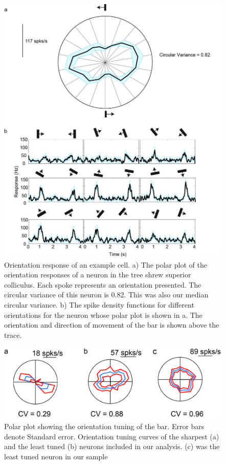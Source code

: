 	\begin{figure}
		
		\includegraphics[width=\linewidth]{superiorcolliculus/SCOriResp.jpg}
		\caption{Orientation response of an example cell. a) The polar plot of the orientation responses of a neuron in the tree shrew superior colliculus. Each spoke represents an orientation presented. The circular variance of this neuron is 0.82. This was also our median circular variance. b) The spike density functions for different orientations for the neuron whose polar plot is shown in a. The orientation and direction of movement of the bar is shown above the trace.}
		\label{fig:fig2}
	\end{figure}
	
	
	\begin{figure}
		\includegraphics[width=\linewidth]{superiorcolliculus/rangeoritun.jpg}
		\caption{Polar plot showing
			the orientation tuning of the bar. Error bars denote
			Standard error. Orientation tuning curves of the
			sharpest (a) and the least tuned (b) neurons
			included in our analysis. (c) was the least tuned
			neuron in our sample}
		\label{fig:fig3}			
	\end{figure}
	

